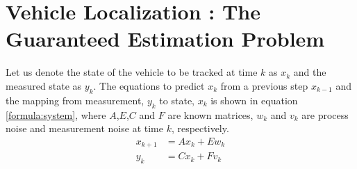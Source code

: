 \chapter{Vehicle Localization : The Guaranteed Estimation Problem} \label{ch:problem}
Let us denote the state of the vehicle to be tracked at time $k$ as $x_k$ and the measured state as $y_k$. The equations to predict $x_k$ from a previous step $x_{k-1}$ and the mapping from measurement, $y_k$ to state, $x_k$ is shown in equation \eqref{formula:system}, where $A$,$E$,$C$ and $F$ are known matrices, $w_k$ and $v_k$ are process noise and measurement noise at time $k$, respectively. 
\begin{equation}
\label{formula:system}
\begin{split}
x_{k+1} &= Ax_k + Ew_k\\
y_k &= Cx_k + Fv_k
\end{split}
\end{equation}


